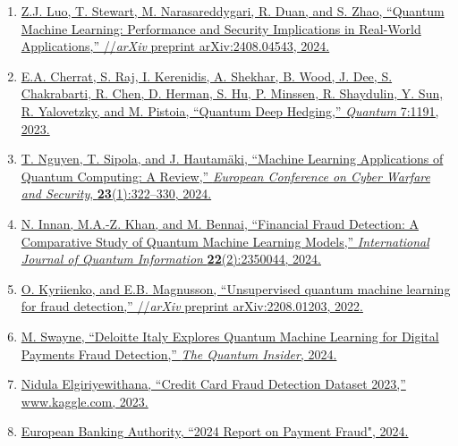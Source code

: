\documentclass[11pt, oneside]{article}   	%
\begin{document}
\begin{enumerate}
   \item \href{https://doi.org/10.48550/arXiv.2408.04543}{Z.J. Luo, T. Stewart, M. Narasareddygari, R. Duan, and S. Zhao, “Quantum Machine Learning: Performance and Security Implications in Real-World Applications,” //\textit{arXiv} preprint arXiv:2408.04543, 2024.}
   
   \item \href{https://doi.org/10.22331/q-2023-11-29-1191}{E.A. Cherrat, S. Raj, I. Kerenidis, A. Shekhar, B. Wood, J. Dee, S. Chakrabarti, R. Chen, D. Herman, S. Hu, P. Minssen, R. Shaydulin, Y. Sun, R. Yalovetzky, and M. Pistoia, “Quantum Deep Hedging,” \textit{Quantum} 7:1191, 2023.}
   
   \item \href{https://doi.org/10.34190/eccws.23.1.2258}{T. Nguyen, T. Sipola, and J. Hautamäki, “Machine Learning Applications of Quantum Computing: A Review,” \textit{European Conference on Cyber Warfare and Security}, \textbf{23}(1):322–330, 2024.}
   
   \item \href{https://doi.org/10.1142/S0219749923500442}{N. Innan, M.A.-Z. Khan, and M. Bennai, “Financial Fraud Detection: A Comparative Study of Quantum Machine Learning Models,” \textit{International Journal of Quantum Information} \textbf{22}(2):2350044, 2024.}
   
   \item \href{https://doi.org/10.48550/arXiv.2208.01203}{O. Kyriienko, and E.B. Magnusson, “Unsupervised quantum machine learning for fraud detection,” //\textit{arXiv} preprint arXiv:2208.01203, 2022.}
   
   \item \href{https://thequantuminsider.com/2024/07/19/deloitte-italy-explores-quantum-machine-learning-for-digital-payments-fraud-detection/}{M. Swayne, “Deloitte Italy Explores Quantum Machine Learning for Digital Payments Fraud Detection,” \textit{The Quantum Insider}, 2024.}
   
   \item \href{https://www.kaggle.com/datasets/nelgiriyewithana/credit-card-fraud-detection-dataset-2023}{Nidula Elgiriyewithana, “Credit Card Fraud Detection Dataset 2023,” www.kaggle.com, 2023.}
   
   \item \href{https://www.eba.europa.eu/sites/default/files/2024-08/465e3044-4773-4e9d-8ca8-b1cd031295fc/EBA_ECB\%202024\%20Report\%20on\%20Payment\%20Fraud.pdf}{European Banking Authority, ``2024 Report on Payment Fraud", 2024.}
   

\end{enumerate}
\end{document}
